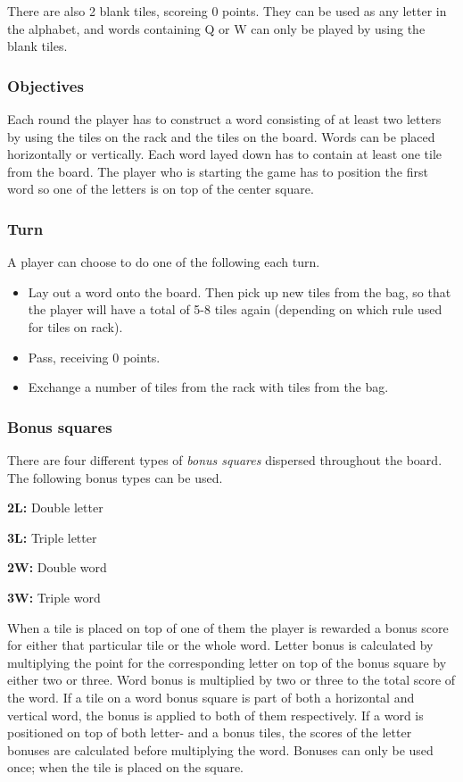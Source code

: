 \documentclass[a4paper, 12pt]{report}
\begin{document}
There are also 2 blank tiles, scoreing 0 points. They can be used as any letter in the alphabet, and words containing Q or W can only be played by using the blank tiles.

\subsubsection{Objectives}
Each round the player has to construct a word consisting of at least two letters by using the tiles on the rack and the tiles on the board. Words can be placed horizontally or vertically. Each word layed down has to contain at least one tile from the board. The player who is starting the game has to position the first word so one of the letters is on top of the center square.

\subsubsection{Turn}
A player can choose to do one of the following each turn.
\begin{itemize}
\item Lay out a word onto the board. Then pick up new tiles from the bag, so that the player will have a total of 5-8 tiles again (depending on which rule used for tiles on rack).
\item Pass, receiving 0 points.
\item Exchange a number of tiles from the rack with tiles from the bag.
\end{itemize}

\subsubsection{Bonus squares}
There are four different types of \emph{bonus squares} dispersed throughout the board. The following bonus types can be used.

\begin{description}
\item{\bf 2L:} Double letter
\item{\bf 3L:} Triple letter
\item{\bf 2W:} Double word
\item{\bf 3W:} Triple word
\end{description}

When a tile is placed on top of one of them the player is rewarded a bonus score for either that particular tile or the whole word. Letter bonus is calculated by multiplying the point for the corresponding letter on top of the bonus square by either two or three. Word bonus is multiplied by two or three to the total score of the word. If a tile on a word bonus square is part of both a horizontal and vertical word, the bonus is applied to both of them respectively. If a word is positioned on top of both letter- and a bonus tiles, the scores of the letter bonuses are calculated before multiplying the word. Bonuses can only be used once; when the tile is placed on the square.
\end{document}
